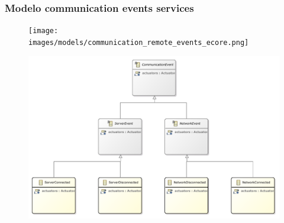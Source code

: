 \subsubsection{Modelo communication events services}

\begin{figure}[ht]
	\centering
    \texttt{[image: images/models/communication\_remote\_events\_ecore.png]}
\end{figure}

\begin{figure}[ht]
	\centering
    \includegraphics[height=0.3\textheight]{images/models/communicationsevents_class_diagram.pdf}
\end{figure}

\clearpage
